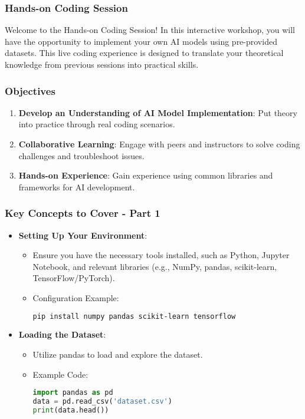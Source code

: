 \documentclass{beamer}
\begin{document}
\begin{frame}
    \frametitle{Hands-on Coding Session}
    Welcome to the Hands-on Coding Session! In this interactive workshop, you will have the opportunity to implement your own AI models using pre-provided datasets. This live coding experience is designed to translate your theoretical knowledge from previous sessions into practical skills.
\end{frame}

\begin{frame}
    \frametitle{Objectives}
    \begin{enumerate}
        \item \textbf{Develop an Understanding of AI Model Implementation}: Put theory into practice through real coding scenarios.
        \item \textbf{Collaborative Learning}: Engage with peers and instructors to solve coding challenges and troubleshoot issues.
        \item \textbf{Hands-on Experience}: Gain experience using common libraries and frameworks for AI development.
    \end{enumerate}
\end{frame}

\begin{frame}[fragile]
    \frametitle{Key Concepts to Cover - Part 1}
    \begin{itemize}
        \item \textbf{Setting Up Your Environment}:
        \begin{itemize}
            \item Ensure you have the necessary tools installed, such as Python, Jupyter Notebook, and relevant libraries (e.g., NumPy, pandas, scikit-learn, TensorFlow/PyTorch).
            \item Configuration Example:
            \begin{lstlisting}[language=bash]
pip install numpy pandas scikit-learn tensorflow
            \end{lstlisting}
        \end{itemize}
        
        \item \textbf{Loading the Dataset}:
        \begin{itemize}
            \item Utilize pandas to load and explore the dataset.
            \item Example Code:
            \begin{lstlisting}[language=python]
import pandas as pd
data = pd.read_csv('dataset.csv')
print(data.head())
            \end{lstlisting}
        \end{itemize}
    \end{itemize}
\end{frame}
\end{document}
